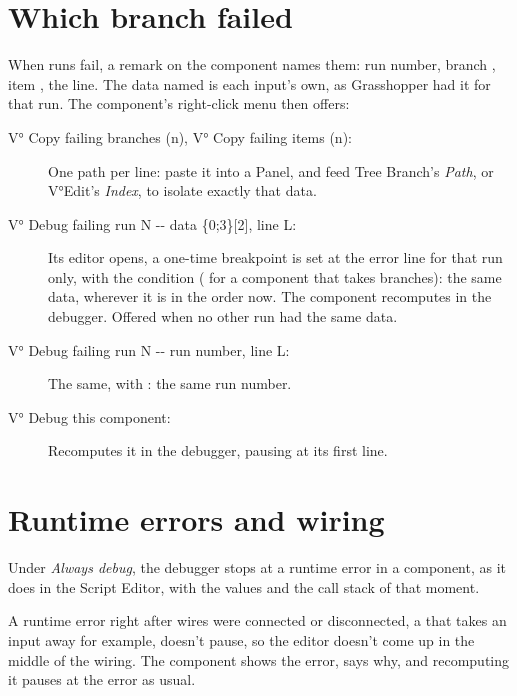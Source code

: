 \section{Which branch failed}\label{sec:failingruns}

When runs fail, a remark on the component names them: run number, branch , item , the
line. The data named is each input's own, as Grasshopper had it for that run. The component's right-click menu
then offers:

\begin{description}
  \item[V° Copy failing branches (n), V° Copy failing items (n):] One path per line: paste it into a Panel, and feed
        Tree Branch's \emph{Path}, or V°Edit's \emph{Index}, to isolate exactly that data.
  \item[{V° Debug failing run N -{}- data \{0;3\}[2], line L:}] Its editor opens, a one-time breakpoint is set at the
        error line for that run only, with the condition  ( for a
        component that takes branches): the same data, wherever it is in the order now. The component recomputes in
        the debugger. Offered when no other run had the same data.
  \item[{V° Debug failing run N -{}- run number, line L:}] The same, with : the same run number.
  \item[V° Debug this component:] Recomputes it in the debugger, pausing at its first line.
\end{description}


\section{Runtime errors and wiring}\label{sec:rewiring}

Under \emph{Always debug}, the debugger stops at a runtime error in a component, as it does in the Script Editor,
with the values and the call stack of that moment.

A runtime error right after wires were connected or disconnected, a  that takes an input away for
example, doesn't pause, so the editor doesn't come up in the middle of the wiring. The component shows the
error,  says why, and recomputing it pauses at the error as usual.

